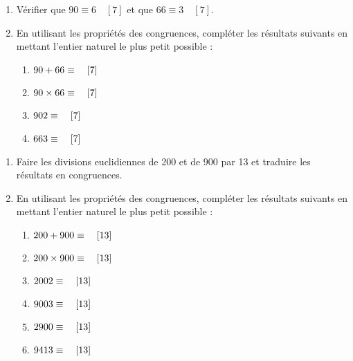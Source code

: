 \documentclass[a4paper,12pt,french]{book}
\begin{document}
\begin{exercice}[]
	\begin{enumerate}[\bfseries 1.]
		\item 	Vérifier que $90\equiv 6\quad[7]$ et que $66\equiv 3\quad[7]$.
		\item 	En utilisant les propriétés des congruences, compléter les résultats suivants en
		mettant l'entier naturel le plus petit possible :
		\begin{multicols}{2}
			\begin{enumerate}[\bfseries a.]
				\item 	$90 + 66\equiv\dotfill\quad[7]$
				\item 	$90 \times 66\equiv\dotfill\quad[7]$	
				\item 	$902\equiv\dotfill\quad[7]$
				\item 	$663\equiv\dotfill\quad[7]$
			\end{enumerate}
		\end{multicols}
	\end{enumerate}
\end{exercice}


\begin{exercice}[]
	
	\begin{enumerate}[\bfseries 1.]
		\item 	Faire les divisions euclidiennes de 200 et de 900 par 13 et traduire les résultats en congruences.
		\item 	En utilisant les propriétés des congruences, compléter les résultats suivants en mettant l'entier naturel le plus petit possible :
		
		\begin{multicols}{2}
			\begin{enumerate}[\bfseries a.]
				\item 	$200 + 900\equiv\dotfill\quad[13]$
				\item 	$200 \times 900\equiv\dotfill\quad[13]$	
				\item 	$2002\equiv\dotfill\quad[13]$
				\item 	$9003\equiv\dotfill\quad[13]$
				\item 	$2900\equiv\dotfill\quad[13]$
				\item 	$9413\equiv\dotfill\quad[13]$
			\end{enumerate}
		\end{multicols}
	\end{enumerate}
\end{exercice}
\end{document}
